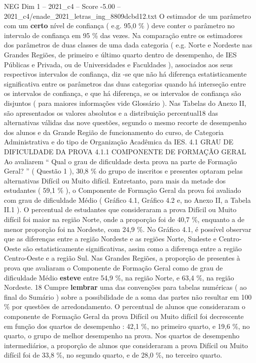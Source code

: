 \begin{textsample}{NEG Dim 1 – 2021\_c4 – Score -5.00 – 2021\_c4/enade\_2021\_letras\_ing\_8809dcbd12.txt}
O estimador de um parâmetro com um \textbf{certo} nível de confiança ( e.g. 95,0 \% ) deve conter o parâmetro no intervalo de confiança em 95 \% das vezes.
Na comparação entre os estimadores dos parâmetros de duas classes de uma dada categoria ( e.g.
Norte e Nordeste nas Grandes Regiões, de primeiro e último quarto dentro de desempenho, de IES Públicas e Privada, ou de Universidades e Faculdades ), associados aos seus respectivos intervalos de confiança, diz -se que não há diferença estatisticamente significativa entre os parâmetros das duas categorias quando há interseção entre os intervalos de confiança, e que há diferença, se os intervalos de confiança são disjuntos ( para maiores informações vide Glossário ).
Nas Tabelas do Anexo II, são apresentados os valores absolutos e a distribuição percentual18 das alternativas válidas das nove questões, segundo o mesmo recorte de desempenho dos alunos e da Grande Região de funcionamento do curso, de Categoria Administrativa e do tipo de Organização Acadêmica da IES. 4.1 GRAU DE DIFICULDADE DA PROVA 4.1.1 COMPONENTE DE FORMAÇÃO GERAL Ao avaliarem “ Qual o grau de dificuldade desta prova na parte de Formação Geral? ” ( Questão 1 ), 30,8 \% do grupo de inscritos e presentes optaram pelas alternativas Difícil ou Muito difícil.
Entretanto, para mais da metade dos estudantes ( 59,1 \% ), o Componente de Formação Geral da prova foi avaliado com grau de dificuldade Médio ( Gráfico 4.1, Gráfico 4.2 e, no Anexo II, a Tabela II.1 ).
O percentual de estudantes que consideraram a prova Difícil ou Muito difícil foi maior na região Norte, onde a proporção foi de 40,7 \%, enquanto a de menor proporção foi na Nordeste, com 24,9 \%.
No Gráfico 4.1, é possível observar que as diferenças entre a região Nordeste e as regiões Norte, Sudeste e Centro-Oeste são estatisticamente significativas, assim como a diferença entre a região Centro-Oeste e a região Sul.
Nas Grandes Regiões, a proporção de presentes à prova que avaliaram o Componente de Formação Geral como de grau de dificuldade Médio \textbf{esteve} entre 54,9 \%, na região Norte, e 63,4 \%, na região Nordeste. 18 Cumpre \textbf{lembrar} uma das convenções para tabelas numéricas ( ao final do Sumário ) sobre a possibilidade de a soma das partes não resultar em 100 \% por questões de arredondamento.
O percentual de alunos que consideraram o componente de Formação Geral da prova Difícil ou Muito difícil foi decrescente em função dos quartos de desempenho : 42,1 \%, no primeiro quarto, e 19,6 \%, no quarto, o grupo de melhor desempenho na prova.
Nos quartos de desempenho intermediários, a proporção de alunos que consideraram a prova Difícil ou Muito difícil foi de 33,8 \%, no segundo quarto, e de 28,0 \%, no terceiro quarto.

\end{textsample}
